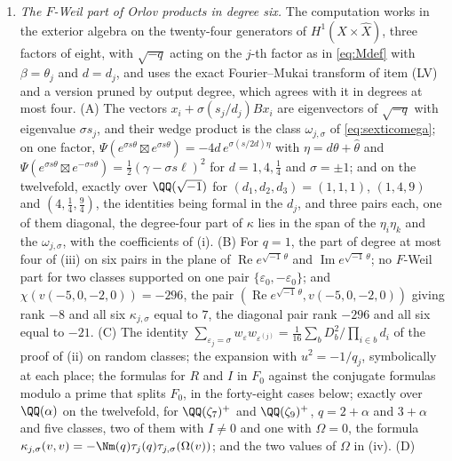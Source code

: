 \begin{enumerate}[label=\textup{(\Roman*)},leftmargin=*]
\item \emph{The $F$-Weil part of Orlov products in degree six.} The
  computation works in the exterior algebra on the twenty-four generators of
  $H^{1}(X\times\widehat X)$, three factors of eight, with $\sqrt{-q}$ acting
  on the $j$-th factor as in \eqref{eq:Mdef} with $\beta=\theta_{j}$ and
  $d=d_{j}$, and uses the exact Fourier--Mukai transform of item (LV) and a
  version pruned by output degree, which agrees with it in degrees at most
  four. (A) The vectors $x_{i}+\sigma(s_{j}/d_{j})Bx_{i}$ are eigenvectors of
  $\sqrt{-q}$ with eigenvalue $\sigma s_{j}$, and their wedge product is the
  class $\omega_{j,\sigma}$ of \eqref{eq:sexticomega}; on one factor,
  $\Psi(e^{\sigma s\theta}\boxtimes e^{\sigma s\theta})=-4d\,
  e^{\sigma(s/2d)\eta}$ with $\eta=d\theta+\widehat\theta$ and
  $\Psi(e^{\sigma s\theta}\boxtimes e^{-\sigma s\theta})
  =\frac12(\gamma-\sigma s\ell)^{2}$ for $d=1,4,\frac14$ and $\sigma=\pm1$;
  and on the twelvefold, exactly over $\QQ(\sqrt{-1})$ for
  $(d_{1},d_{2},d_{3})=(1,1,1)$, $(1,4,9)$ and $(4,\frac14,\frac94)$, the
  identities being formal in the $d_{j}$, and three pairs each, one of them
  diagonal, the degree-four part of $\kappa$ lies in the span of the
  $\eta_{i}\eta_{k}$ and the $\omega_{j,\sigma}$, with the coefficients of
  (i). (B) For $q=1$, the part of degree at most four of
  (iii) on six pairs in the plane of
  $\operatorname{Re}e^{\sqrt{-1}\,\theta}$ and
  $\operatorname{Im}e^{\sqrt{-1}\,\theta}$; no $F$-Weil part for two classes
  supported on one pair $\{\varepsilon_{0},-\varepsilon_{0}\}$; and
  $\chi(v(-5,0,-2,0))=-296$, the pair $(\operatorname{Re}
  e^{\sqrt{-1}\,\theta},v(-5,0,-2,0))$ giving rank $-8$ and all six
  $\kappa_{j,\sigma}$ equal to $7$, the diagonal pair rank $-296$ and all
  six equal to $-21$. (C) The identity $\sum_{\varepsilon_{j}=\sigma}
  w_{\varepsilon}w_{\varepsilon^{(j)}}=\frac1{16}\sum_{b}D_{b}^{2}/
  \prod_{i\in b}d_{i}$ of the proof of (ii) on random
  classes; the expansion with $u^{2}=-1/q_{j}$, symbolically at each place;
  the formulas for $R$ and $I$ in $F_{0}$ against the conjugate formulas
  modulo a prime that splits $F_{0}$, in the forty-eight cases below; exactly
  over $\QQ(\alpha)$ on the twelvefold, for $\QQ(\zeta_{7})^{+}$ and
  $\QQ(\zeta_{9})^{+}$, $q=2+\alpha$ and $3+\alpha$ and five classes, two of
  them with $I\ne0$ and one with $\Omega=0$, the formula
  $\kappa_{j,\sigma}(v,v)=-\Nm(q)\tau_{j}(q)\tau_{j,\sigma}(\Omega(v))$; and
  the two values of $\Omega$ in (iv). (D)

\end{enumerate}

